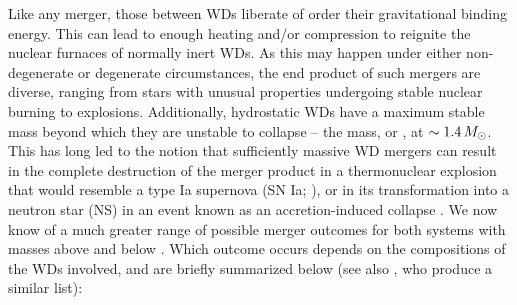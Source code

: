 Like any merger, those between WDs liberate of order their gravitational binding energy.  This can lead to enough heating and/or compression to reignite the nuclear furnaces of normally inert WDs.  As this may happen under either non-degenerate or degenerate circumstances, the end product of such mergers are diverse, ranging from stars with unusual properties undergoing stable nuclear burning to explosions. Additionally, hydrostatic WDs have a maximum stable mass beyond which they are unstable to collapse -- the \cite{chan31} mass, or \Mch, at $\sim1.4\,\Msun$.  This has long led to the notion that sufficiently massive WD mergers can result in the complete destruction of the merger product in a thermonuclear explosion that would resemble a type Ia supernova (SN Ia; \citealt{webb84}), or in its transformation into a neutron star (NS) in an event known as an accretion-induced collapse \citep{nomoi85, saion85}.  We now know of a much greater range of possible merger outcomes for both systems with masses above and below \Mch.  Which outcome occurs depends on the compositions of the WDs involved, and are briefly summarized below (see also \citealt{dan+14}, who produce a similar list):


